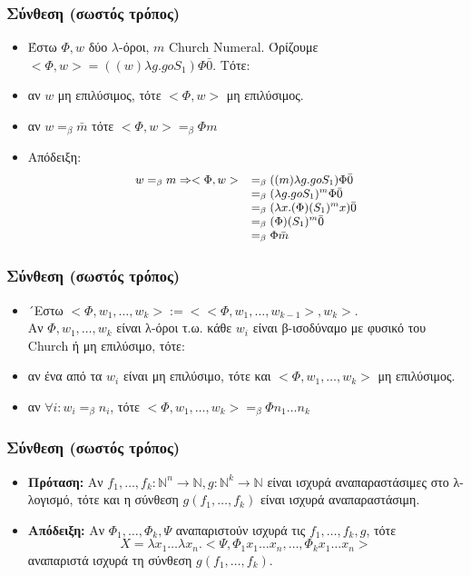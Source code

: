 \documentclass{beamer}
\begin{document}
\begin{frame}
  \frametitle{Σύνθεση (σωστός τρόπος)}
  \begin{itemize}
  \item Έστω $\Phi, w$ δύο $\lambda$-όροι, $m$ Church
    Numeral. Όρίζουμε $<\Phi, w> = ((w) \lambda g . g o S_1) \Phi
    \bar{0}$. Τότε: \pause
  \item αν $w$ μη επιλύσιμος, τότε $<\Phi, w>$ μη επιλύσιμος. \pause
  \item αν $w =_\beta \bar{m}$ τότε $<\Phi, w> =_\beta \Phi m$ \pause
  \item Απόδειξη: 
    $$
    \small
    \begin{array}{ll}
      w =_\beta m \Rightarrow <\Phi, w>
      & =_\beta ((m) \lambda g . g o S_1) \Phi \bar{0}\\
      & =_\beta (\lambda g . g o S_1)^m \Phi \bar{0} \\
      & =_\beta (\lambda x . (\Phi) (S_1)^m x) \bar{0} \\
      & =_\beta (\Phi) (S_1)^m \bar{0} \\
      & =_\beta \Phi \bar{m}
    \end{array}
    $$           	
  \end{itemize}
\end{frame}

\begin{frame}
  \frametitle{Σύνθεση (σωστός τρόπος)}
  \begin{itemize}
  \item ´Εστω $<\Phi, w_1,\ldots, w_k> := <<\Phi, w_1,\ldots,
    w_{k-1}>, w_k>$. \\ Αν $\Phi, w_1,\ldots, w_k$ είναι λ-όροι
    τ.ω. κάθε $w_i$ είναι β-ισοδύναμο με φυσικό του Church ή μη
    επιλύσιμο, τότε: \pause
  \item αν ένα από τα $w_i$ είναι μη επιλύσιμο, τότε και $<\Phi,
    w_1,\ldots, w_k>$ μη επιλύσιμος. \pause
  \item αν $\forall i: w_i =_\beta n_i$, τότε $<\Phi, w_1,\ldots, w_k>
    =_\beta \Phi n_1 \ldots n_k$
  \end{itemize}
\end{frame}

\begin{frame}
  \frametitle{Σύνθεση (σωστός τρόπος)}
  \begin{itemize}
  \item \textbf{Πρόταση:} Αν $f_1,\ldots,f_k : \mathbb{N}^n
    \rightarrow \mathbb{N}, g : \mathbb{N}^k \rightarrow \mathbb{N}$
    είναι ισχυρά αναπαραστάσιμες στο λ-λογισμό, τότε και η σύνθεση
    $g(f_1,\ldots,f_k)$ είναι ισχυρά αναπαραστάσιμη. \pause
  \item \textbf{Απόδειξη:} Αν $\Phi_1, \ldots, \Phi_k, \Psi$
    αναπαριστούν ισχυρά τις $f_1,\ldots, f_k, g$, τότε
    $$X = \lambda x_1 \ldots \lambda x_n . <\Psi, \Phi_1 x_1 \ldots
    x_n, \ldots, \Phi_k x_1 \ldots x_n> $$ αναπαριστά ισχυρά τη
    σύνθεση $g(f_1,\ldots,f_k)$.
  \end{itemize}
\end{frame}
\end{document}
